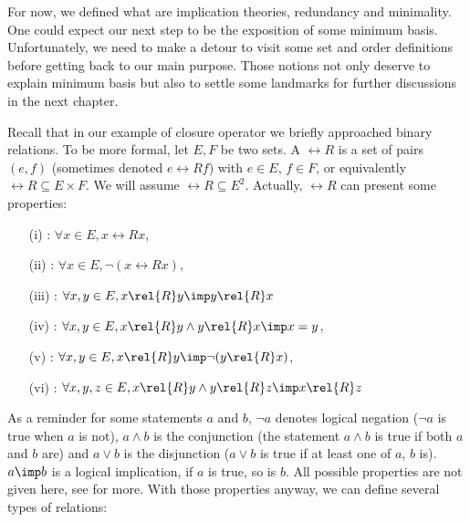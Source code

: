 \vspace{1.2em}

For now, we defined what are implication theories, redundancy and minimality. 
One could expect our next step to be the exposition of some minimum basis. 
Unfortunately, we need to make a detour to visit some set and order definitions
before getting back to our main purpose. Those notions not only deserve to
explain minimum basis but also to settle some landmarks for further discussions 
in the next chapter.

\vspace{1.2em}

Recall that in our example of closure operator we briefly approached binary 
relations. To be more formal, let $E, F$ be two sets. A  $\rel{R}$ is a set of pairs $(e, f)$ (sometimes denoted 
$e \rel{R} f$) with $e \in E$, $f \in F$, or equivalently $\rel{R} \subseteq E 
\times F$. We will assume $\rel{R} \subseteq E^2$. Actually, $\rel{R}$ can 
present some properties:
\begin{itemize}
	\item[(i)] : $\forall x \in E, x\rel{R}x$,
	\item[(ii)] : $\forall x \in E, \lnot(x\rel{R}x)$,
	\item[(iii)] : $\forall x, y \in E, x \rel{R} y \imp y 
	\rel{R} x$
	\item[(iv)] : $\forall x, y \in E, x \rel{R} y \land 
	y \rel{R} x \imp x = y$,
	\item[(v)] : $\forall x, y \in E, x \rel{R} y \imp
	\lnot(y\rel{R}x)$,
	\item[(vi)] : $\forall x, y, z \in E, x \rel{R} y 
	\land y \rel{R} z \imp x \rel{R} z$
\end{itemize}
As a reminder for some statements $a$ and $b$, $\lnot a$ denotes logical negation ($\lnot a$ is true when $a$ is not), $a \land b$ is the conjunction (the statement $a \land b$ is true if both $a$ and $b$ are) and $a \lor b$ is the disjunction ($a \lor b$ is true if at least one of $a$, $b$ is). $a \imp b$ is a logical implication, if $a$ is true, so is $b$. All possible properties are not given here, see \cite{cori_mathematical_2000} 
for more. With those properties anyway, we can define several types of 
relations:

